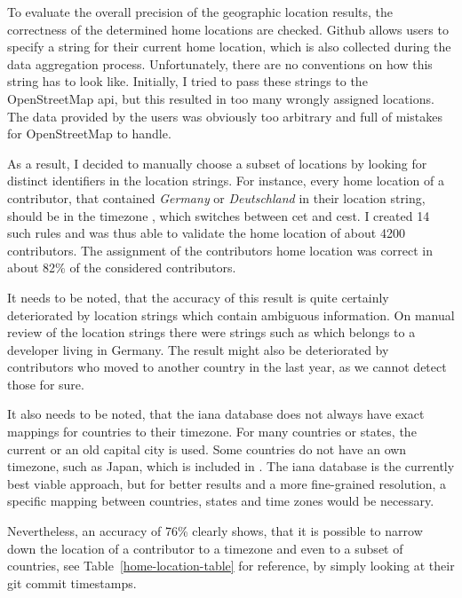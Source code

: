 To evaluate the overall precision of the geographic location results, the correctness of the determined home locations are checked.
Github allows users to specify a string for their current home location, which is also collected during the data aggregation process.
Unfortunately, there are no conventions on how this string has to look like.
Initially, I tried to pass these strings to the OpenStreetMap \ac{api}, but this resulted in too many wrongly assigned locations.
The data provided by the users was obviously too arbitrary and full of mistakes for OpenStreetMap to handle.

As a result, I decided to manually choose a subset of locations by looking for distinct identifiers in the location strings.
For instance, every home location of a contributor, that contained \emph{Germany} or \emph{Deutschland} in their location string, should be in the timezone , which switches between \ac{cet} and \ac{cest}.
I created 14 such rules and was thus able to validate the home location of about 4200 contributors.
The assignment of the contributors home location was correct in about 82\% of the considered contributors.

It needs to be noted, that the accuracy of this result is quite certainly deteriorated by location strings which contain ambiguous information.
On manual review of the location strings there were strings such as  which belongs to a developer living in Germany.
The result might also be deteriorated by contributors who moved to another country in the last year, as we cannot detect those for sure.

It also needs to be noted, that the \ac{iana} database does not always have exact mappings for countries to their timezone.
For many countries or states, the current or an old capital city is used.
Some countries do not have an own timezone, such as Japan, which is included in .
The \ac{iana} database is the currently best viable approach, but for better results and a more fine-grained resolution, a specific mapping between countries, states and time zones would be necessary.

Nevertheless, an accuracy of 76\% clearly shows, that it is possible to narrow down the location of a contributor to a timezone and even to a subset of countries, see Table~\ref{home-location-table} for reference, by simply looking at their git commit timestamps.


